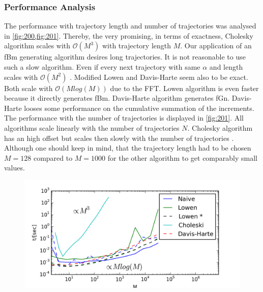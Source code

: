 \documentclass[
  a4paper,BCOR10mm,oneside,
  headsepline,footsepline,%
  fleqn,openbib
]{scrbook}
\begin{document}
\subsubsection{Performance Analysis}
The performance with trajectory length and number of trajectories was analysed in \cref{fig:200,fig:201}. Thereby, the very promising, in terms of exactness, Cholesky algorithm scales with $\mathcal{O}(M^3)$ with trajectory length $M$. Our application of an fBm generating algorithm desires long trajectories. It is not reasonable to use such a slow algorithm. Even if every next trajectory with same $\alpha$ and length scales with $\mathcal{O}(M^2)$ \cite{Dieker2004}.  Modified Lowen and Davis-Harte seem also to be exact. Both scale with $\mathcal{O}(M log(M))$ due to the FFT. Lowen algorithm is even faster because it directly generates fBm. Davis-Harte algorithm generates fGn. Davis-Harte looses some performance on the cumulative summation of the increments. The performance with the number of trajectories is displayed in \cref{fig:201}. All algorithms scale linearly with the number of trajectories $N$. Cholesky algorithm has an high offset but scales then slowly with the number of trajectories . Although one should keep in mind, that the trajectory length had to be chosen $M=128$ compared to $M=1000$ for the other algorithm to get comparably small values.
\begin{figure}[h!]
  \centering
  \includegraphics[width=\linewidth]{./data/nongaussiandouble1.png}
  \captionsetup{width=1.0\linewidth}
  \label{fig:200}
\end{figure}
\end{document}
